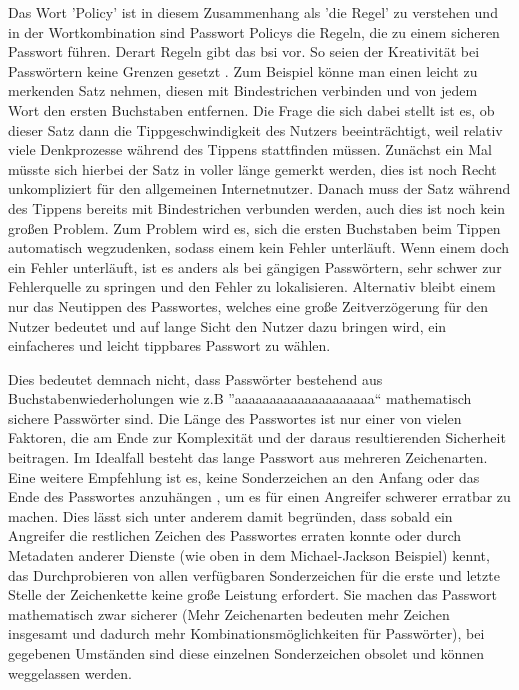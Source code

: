 Das Wort 'Policy' ist in diesem Zusammenhang als 'die Regel' zu verstehen und in der Wortkombination sind Passwort Policys die Regeln, die zu einem sicheren Passwort führen. Derart Regeln gibt das \ac{bsi} vor. So seien der Kreativität bei Passwörtern keine Grenzen gesetzt \cite{A4}. Zum Beispiel könne man einen leicht zu merkenden Satz nehmen, diesen mit Bindestrichen verbinden und von jedem Wort den ersten Buchstaben entfernen. Die Frage die sich dabei stellt ist es, ob dieser Satz dann die Tippgeschwindigkeit des Nutzers beeinträchtigt, weil relativ viele Denkprozesse während des Tippens stattfinden müssen. Zunächst ein Mal müsste sich hierbei der Satz in voller länge gemerkt werden, dies ist noch Recht unkompliziert für den allgemeinen Internetnutzer. Danach muss der Satz während des Tippens bereits mit Bindestrichen verbunden werden, auch dies ist noch kein großen Problem. Zum Problem wird es, sich die ersten Buchstaben beim Tippen automatisch wegzudenken, sodass einem kein Fehler unterläuft. Wenn einem doch ein Fehler unterläuft, ist es anders als bei gängigen Passwörtern, sehr schwer zur Fehlerquelle zu springen und den Fehler zu lokalisieren. Alternativ bleibt einem nur das Neutippen des Passwortes, welches eine große Zeitverzögerung für den Nutzer bedeutet und auf lange Sicht den Nutzer dazu bringen wird, ein einfacheres und leicht tippbares Passwort zu wählen.

Dies bedeutet demnach nicht, dass Passwörter bestehend aus Buchstabenwiederholungen wie z.B ''aaaaaaaaaaaaaaaaaaaa`` mathematisch sichere Passwörter sind. Die Länge des Passwortes ist nur einer von vielen Faktoren, die am Ende zur Komplexität und der daraus resultierenden Sicherheit beitragen. Im Idealfall besteht das lange Passwort aus mehreren Zeichenarten. Eine weitere Empfehlung ist es, keine Sonderzeichen an den Anfang oder das Ende des Passwortes anzuhängen \cite{A4}, um es für einen Angreifer schwerer erratbar zu machen. Dies lässt sich unter anderem damit begründen, dass sobald ein Angreifer die restlichen Zeichen des Passwortes erraten konnte oder durch Metadaten anderer Dienste (wie oben in dem Michael-Jackson Beispiel) kennt, das Durchprobieren von allen verfügbaren Sonderzeichen für die erste und letzte Stelle der Zeichenkette keine große Leistung erfordert. Sie machen das Passwort mathematisch zwar sicherer (Mehr Zeichenarten bedeuten mehr Zeichen insgesamt und dadurch mehr Kombinationsmöglichkeiten für Passwörter), bei gegebenen Umständen sind diese einzelnen Sonderzeichen obsolet und können weggelassen werden.

